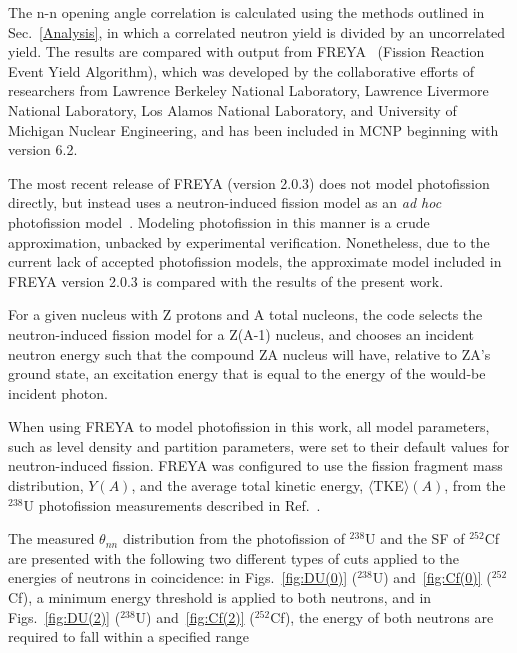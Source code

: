 The n-n opening angle correlation is calculated using the methods outlined in Sec.~\ref{Analysis}, in which a correlated neutron yield is divided by an uncorrelated yield.
The results are compared with output from FREYA~\cite{FREYA} (Fission Reaction Event Yield Algorithm), which was developed by the collaborative efforts of researchers from Lawrence Berkeley National Laboratory,  Lawrence Livermore National Laboratory, Los Alamos National Laboratory, and University of Michigan Nuclear Engineering, and has been included in MCNP beginning with version 6.2.
 
The most recent release of FREYA (version 2.0.3) does not model photofission directly, but instead uses a neutron-induced fission model as an {\em{ad hoc}} photofission model~\cite{FREYA_photofission}.
Modeling photofission in this manner is a crude approximation, unbacked by experimental verification.
Nonetheless, due to the current lack of accepted photofission models, the approximate model included in FREYA version 2.0.3 is compared with the results of the present work. 

For a given nucleus with Z protons and A total nucleons, the code selects the neutron-induced fission model for a Z(A-1) nucleus, and chooses an incident neutron energy such that the compound ZA nucleus will have, relative to ZA's ground state, an excitation energy that is equal to the energy of the would-be incident photon.

When using FREYA to model photofission in this work, all model parameters, such as level density and partition parameters, were set to their default values for neutron-induced fission.
FREYA was configured to use the fission fragment mass distribution, $Y(A)$, and the average total kinetic energy, $\langle$TKE$\rangle(A)$, from the $^{238}$U photofission measurements described in Ref.~\cite{2017Krishichayan}.


The measured $\theta_{nn}$ distribution from the photofission of $^{238}$U and the SF of $^{252}$Cf are presented with the following two different types of cuts applied to the energies of neutrons in coincidence:
in Figs.~\ref{fig:DU(0)} ($^{238}$U) and~\ref{fig:Cf(0)} ($^{252}$Cf), a minimum energy threshold is applied to both neutrons, and in Figs.~\ref{fig:DU(2)} ($^{238}$U) and~\ref{fig:Cf(2)} ($^{252}$Cf), the energy of both neutrons are required to fall within a specified range

